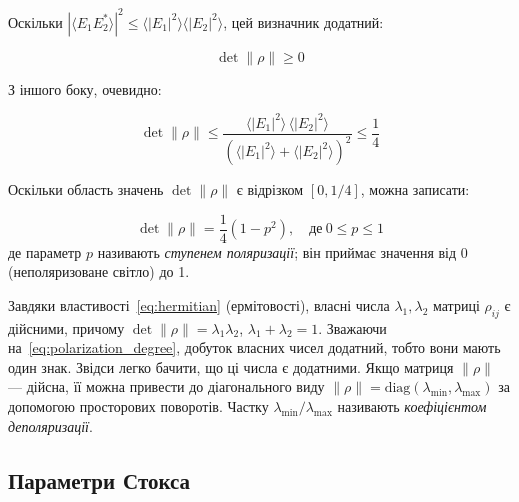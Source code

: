 Оскільки \(|\langle E_1 E_2^{*} \rangle|^2 \leqslant  \langle |E_1|^2 \rangle \langle |E_2|^2 \rangle\), цей визначник
додатний:

\begin{equation*}
	\det \|\rho\| \geqslant 0
\end{equation*}

З іншого боку, очевидно:

\begin{equation*}
	\det \|\rho\| \leqslant
	\frac{\langle |E_1|^2 \rangle \, \langle |E_2|^2 \rangle}
	{\left(\langle |E_1|^2 \rangle + \langle |E_2|^2 \rangle\right)^2}
	\leqslant \frac{1}{4}
\end{equation*}

Оскільки область значень \(\det \|\rho\| \) є відрізком \([0, 1/4]\), можна записати:

\begin{equation}
	\det \|\rho\| = \frac{1}{4} \left( 1 - p^2 \right),\quad  \text{де}\  0 \leqslant  p \leqslant 1
	\label{eq:polarization_degree}
\end{equation}
%
де параметр \(p\) називають \emph{ступенем поляризації}; він приймає значення від 0
(неполяризоване світло) до 1.

Завдяки властивості~\eqref{eq:hermitian} (ермітовості), власні числа \(\lambda_1, \lambda_2\) матриці \(\rho_{ij}\) є
дійсними, причому \(\det \|\rho\| = \lambda_1 \lambda_2\), \(\lambda_1 + \lambda_2 = 1\). Зважаючи
на~\eqref{eq:polarization_degree}, добуток власних чисел додатний, тобто вони мають один знак. Звідси легко бачити, що
ці числа є додатними. Якщо матриця $\|\rho \|$ --- дійсна, її можна привести до діагонального виду  $\| \rho \| =
\mathrm{diag}(\lambda_{\min}, \lambda_{\max})$ за допомогою просторових поворотів. Частку
\(\lambda_{\min}/\lambda_{\max}\) називають \emph{коефіцієнтом деполяризації}.

\subsection*{Параметри Стокса}

